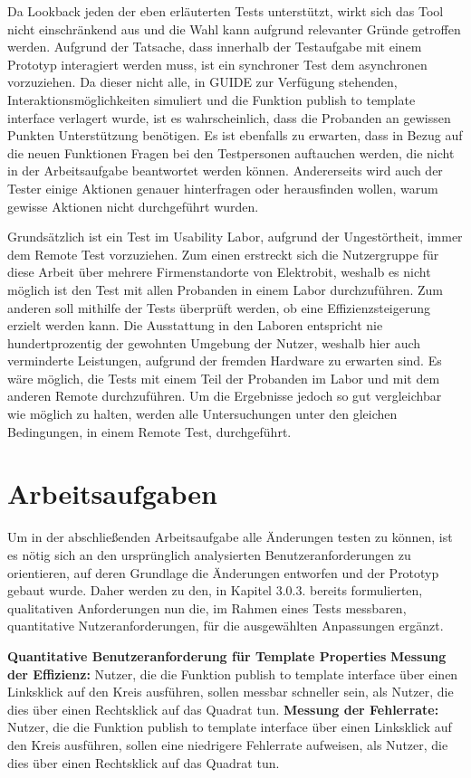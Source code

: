 Da Lookback jeden der eben erläuterten Tests unterstützt, wirkt sich das Tool nicht einschränkend aus und die Wahl kann aufgrund relevanter Gründe getroffen werden.
Aufgrund der Tatsache, dass innerhalb der Testaufgabe mit einem Prototyp interagiert werden muss, ist ein synchroner Test dem asynchronen vorzuziehen.
Da dieser nicht alle, in GUIDE zur Verfügung stehenden, Interaktionsmöglichkeiten simuliert und die Funktion \glqq publish to template interface\grqq{} verlagert wurde, ist es wahrscheinlich, dass die Probanden an gewissen Punkten Unterstützung benötigen.
Es ist ebenfalls zu erwarten, dass in Bezug auf die neuen Funktionen Fragen bei den Testpersonen auftauchen werden, die nicht in der Arbeitsaufgabe beantwortet werden können.
Andererseits wird auch der Tester einige Aktionen genauer hinterfragen oder herausfinden wollen, warum gewisse Aktionen nicht durchgeführt wurden.

Grundsätzlich ist ein Test im Usability Labor, aufgrund der Ungestörtheit, immer dem Remote Test vorzuziehen.
Zum einen erstreckt sich die Nutzergruppe für diese Arbeit über mehrere Firmenstandorte von Elektrobit, weshalb es nicht möglich ist den Test mit allen Probanden in einem Labor durchzuführen.
Zum anderen soll mithilfe der Tests überprüft werden, ob eine Effizienzsteigerung erzielt werden kann.
Die Ausstattung in den Laboren entspricht nie hundertprozentig der gewohnten Umgebung der Nutzer, weshalb hier auch verminderte Leistungen, aufgrund der fremden Hardware zu erwarten sind.
Es wäre möglich, die Tests mit einem Teil der Probanden im Labor und mit dem anderen Remote durchzuführen.
Um die Ergebnisse jedoch so gut vergleichbar wie möglich zu halten, werden alle Untersuchungen unter den gleichen Bedingungen, in einem Remote Test, durchgeführt.

\section{Arbeitsaufgaben}
Um in der abschließenden Arbeitsaufgabe alle Änderungen testen zu können, ist es nötig sich an den ursprünglich analysierten Benutzeranforderungen zu orientieren, auf deren Grundlage die Änderungen entworfen und der Prototyp gebaut wurde.
Daher werden zu den, in Kapitel 3.0.3. bereits formulierten, qualitativen Anforderungen nun die, im Rahmen eines Tests messbaren, quantitative Nutzeranforderungen, für die ausgewählten Anpassungen ergänzt.

\textbf{Quantitative Benutzeranforderung für Template Properties}\newline
\textbf{Messung der Effizienz:}
Nutzer, die die Funktion \glqq publish to template interface\grqq{} über einen Linksklick auf den Kreis ausführen, sollen messbar schneller sein, als Nutzer, die dies über einen Rechtsklick auf das Quadrat tun. \newline
\textbf{Messung der Fehlerrate:} 
Nutzer, die die Funktion \glqq publish to template interface\grqq{} über einen Linksklick auf den Kreis ausführen, sollen eine niedrigere Fehlerrate aufweisen, als Nutzer, die dies über einen Rechtsklick auf das Quadrat tun.

